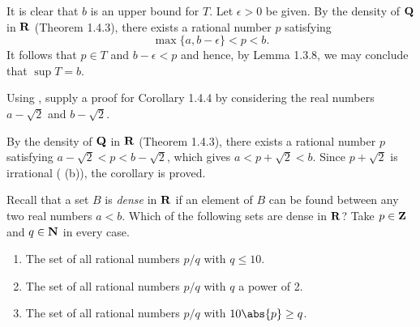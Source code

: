 \documentclass{lew98_solutions}
\begin{document}
\begin{solution}
    It is clear that \( b \) is an upper bound for \( T \). Let \( \epsilon > 0 \) be given. By the density of \( \mathbf{Q} \) in \( \mathbf{R} \) (Theorem 1.4.3), there exists a rational number \( p \) satisfying
    \[
        \max \{ a, b - \epsilon \} < p < b.
    \]
    It follows that \( p \in T \) and \( b - \epsilon < p \) and hence, by Lemma 1.3.8, we may conclude that \( \sup T = b \).
\end{solution}

\begin{exercise}
\label{ex:1.4.5}
    Using , supply a proof for Corollary 1.4.4 by considering the real numbers \( a - \sqrt{2} \) and \( b - \sqrt{2} \).
\end{exercise}

\begin{solution}
    By the density of \( \mathbf{Q} \) in \( \mathbf{R} \) (Theorem 1.4.3), there exists a rational number \( p \) satisfying \( a - \sqrt{2} < p < b - \sqrt{2} \), which gives \( a < p + \sqrt{2} < b \). Since \( p + \sqrt{2} \) is irrational ( (b)), the corollary is proved.
\end{solution}

\begin{exercise}
\label{ex:1.4.6}
    Recall that a set \( B \) is \textit{dense} in \( \mathbf{R} \) if an element of \( B \) can be found between any two real numbers \( a < b \). Which of the following sets are dense in \( \mathbf{R} \)? Take \( p \in \mathbf{Z} \) and \( q \in \mathbf{N} \) in every case.
    \begin{enumerate}
        \item The set of all rational numbers \( p/q \) with \( q \leq 10 \).

        \item The set of all rational numbers \( p/q \) with \( q \) a power of 2.

        \item The set of all rational numbers \( p/q \) with \( 10 \abs{p} \geq q \).
    \end{enumerate}
\end{exercise}
\end{document}
